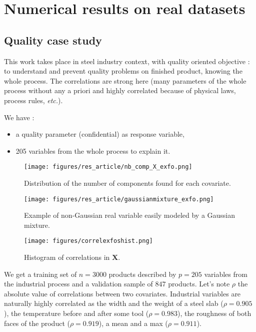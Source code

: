 \documentclass[12pt,a4paper]{report}
\begin{document}
\chapter{Numerical results on real datasets} \label{sectionrealcase}
	\section{Quality case study} \label{sectionexfos}
This work takes place in steel industry context, with quality oriented objective : to understand and prevent quality problems on finished product, knowing the whole process. The correlations are strong here (many parameters of the whole process without any a priori and highly correlated because of physical laws, process rules, {\it etc.}). 
		
We have :
		\begin{itemize}
			\item a quality parameter (confidential) as response variable,
			\item 205 variables from the whole process to explain it.
		\end{itemize}

\begin{figure}[h!]
	\begin{minipage}[t]{.30\linewidth}
			\texttt{[image: figures/res\_article/nb\_comp\_X\_exfo.png]}%
			\caption{Distribution of the number of components found for each covariate.}\label{graphMixmod}
	\end{minipage} \hfill
	\begin{minipage}[t]{.30\linewidth}
			\texttt{[image: figures/res\_article/gaussianmixture\_exfo.png]}%
			\caption{Example of non-Gaussian real variable easily modeled by a Gaussian mixture.}
	\end{minipage} \hfill
   \begin{minipage}[t]{.30\linewidth}
			\texttt{[image: figures/correlexfoshist.png]} 
			\caption{Histogram of correlations in $\boldsymbol{X}$.} \label{compareMSEexfos}
   \end{minipage}
\end{figure}   			
	We get a training set of $n=3 000$ products described by $p=205$ variables from the industrial process and a validation sample of $847$ products.
	Let's note $\rho$ the absolute value of correlations between two covariates. Industrial variables are naturally highly correlated as the width and the weight of a steel slab ($\rho=0.905$), the temperature before and after some tool ($\rho=0.983$), the  roughness of both faces of the product ($\rho= 0.919$), a mean and a max ($\rho=0.911$). 
	
\end{document}
